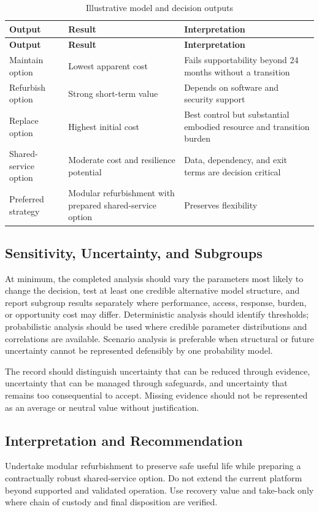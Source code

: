 \begin{longtable}{@{}p{}p{}p{}@{}}
\caption{Illustrative model and decision outputs}
\label{tab:comp-ch14-outputs}\\
\toprule
\textbf{Output} & \textbf{Result} & \textbf{Interpretation} \\
\midrule
\endfirsthead
\toprule
\textbf{Output} & \textbf{Result} & \textbf{Interpretation} \\
\midrule
\endhead
\bottomrule
\endlastfoot
Maintain option & Lowest apparent cost & Fails supportability beyond 24 months without a transition \\
Refurbish option & Strong short-term value & Depends on software and security support \\
Replace option & Highest initial cost & Best control but substantial embodied resource and transition burden \\
Shared-service option & Moderate cost and resilience potential & Data, dependency, and exit terms are decision critical \\
Preferred strategy & Modular refurbishment with prepared shared-service option & Preserves flexibility \\
\end{longtable}

\subsection{Sensitivity, Uncertainty, and Subgroups}
At minimum, the completed analysis should vary the parameters most likely to
change the decision, test at least one credible alternative model structure, and
report subgroup results separately where performance, access, response, burden,
or opportunity cost may differ. Deterministic analysis should identify thresholds;
probabilistic analysis should be used where credible parameter distributions and
correlations are available. Scenario analysis is preferable when structural or
future uncertainty cannot be represented defensibly by one probability model.

The record should distinguish uncertainty that can be reduced through evidence,
uncertainty that can be managed through safeguards, and uncertainty that remains
too consequential to accept. Missing evidence should not be represented as an
average or neutral value without justification.

\subsection{Interpretation and Recommendation}
Undertake modular refurbishment to preserve safe useful life while preparing a contractually robust shared-service option. Do not extend the current platform beyond supported and validated operation. Use recovery value and take-back only where chain of custody and final disposition are verified.

